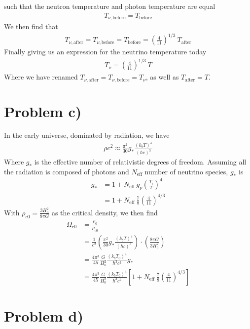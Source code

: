 \documentclass[reprint,english,notitlepage]{revtex4-1}  %
\numberwithin{equation}{section}
\begin{document}
such that the neutron temperature and photon temperature are equal
\begin{align}
	T_{\nu,\mathrm{before}} = T_\mathrm{before}
\end{align}
We then find that
\begin{align}
	T_{\nu,\mathrm{after}} = T_{\nu,\mathrm{before}} = T_\mathrm{before} = \left(\frac{4}{11}\right)^{1/3} \ T_\mathrm{after}
\end{align}
Finally giving us an expression for the neutrino temperature today
\begin{align}
	T_\nu = \left(\frac{4}{11}\right)^{1/3} \ T
\end{align}
Where we have renamed $T_{\nu,\mathrm{after}} = T_{\nu,\mathrm{before}} = T_\nu$, as well as
$T_\mathrm{after} = T$.
\section{Problem c)}
In the early universe, dominated by radiation, we have
\begin{align}
	\rho c^2 \approx \frac{\pi^2}{30} g_* \frac{(k_b T)^4}{(\hbar c)^3}
\end{align}
Where $g_*$ is the effective number of relativistic degrees of freedom. Assuming
all the radiation is composed of photons and $N_\mathrm{eff}$ number of neutrino species,
$g_*$ is
\begin{align}
	g_* &= 1 + N_{\mathrm{eff}}\ g_\nu	\left( \frac{T_i}{T} \right)^4 \\ %
	    &= 1 + N_{\mathrm{eff}}\ \frac{7}{8}	\left(\frac{4}{11}\right)^{4/3}
\end{align}
With $\rho_{c0}=\frac{3H_0^2}{8\pi G}$ as the critical density, we then find
\begin{align}
	\Omega_{r0} &= \frac{\rho_{0}}{\rho_{c0}} \\
							&= \frac{1}{c^2} \left(\frac{\pi^2}{30} g_*
								\frac{(k_b T)^4}{(\hbar c)^3  }\right)\cdot
								\left({\frac{8\pi G}{3H_0^2}}\right) \\
							&= \frac{4\pi^3}{45}\frac{G}{H_0^2}\frac{(k_b T_0)^4}{\hbar^3 c^5}
								g_* \\
							&= \frac{4\pi^3}{45}\frac{G}{H_0^2}\frac{(k_b T_0)^4}{\hbar^3 c^5}
								\left[1 + N_{\mathrm{eff}}\ \frac{7}{8}	\left(\frac{4}{11}\right)^{4/3}\right]
\end{align}
\section{Problem d)}
\end{document}
